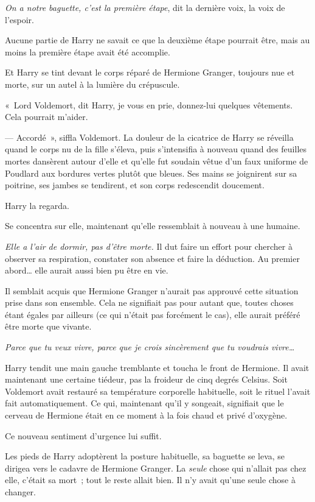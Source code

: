 \emph{On a notre baguette, c'est la première étape}, dit la dernière voix, la voix de l'espoir.

Aucune partie de Harry ne savait ce que la deuxième étape pourrait être, mais au moins la première étape avait été accomplie.

Et Harry se tint devant le corps réparé de Hermione Granger, toujours nue et morte, sur un autel à la lumière du crépuscule.

«~Lord Voldemort, dit Harry, je vous en prie, donnez-lui quelques vêtements. Cela pourrait m'aider.

--- Accordé~», siffla Voldemort. La douleur de la cicatrice de Harry se réveilla quand le corps nu de la fille s'éleva, puis s'intensifia à nouveau quand des feuilles mortes dansèrent autour d'elle et qu'elle fut soudain vêtue d'un faux uniforme de Poudlard aux bordures vertes plutôt que bleues. Ses mains se joignirent sur sa poitrine, ses jambes se tendirent, et son corps redescendit doucement.

Harry la regarda.

Se concentra sur elle, maintenant qu'elle ressemblait à nouveau à une humaine.

\emph{Elle a l'air de dormir, pas d'être morte.} Il dut faire un effort pour chercher à observer sa respiration, constater son absence et faire la déduction. Au premier abord… elle aurait aussi bien pu être en vie.

Il semblait acquis que Hermione Granger n'aurait pas approuvé cette situation prise dans son ensemble. Cela ne signifiait pas pour autant que, toutes choses étant égales par ailleurs (ce qui n'était pas forcément le cas), elle aurait préféré être morte que vivante.

\emph{Parce que tu veux vivre, parce que je crois sincèrement que tu voudrais vivre…}

Harry tendit une main gauche tremblante et toucha le front de Hermione. Il avait maintenant une certaine tiédeur, pas la froideur de cinq degrés Celsius. Soit Voldemort avait restauré sa température corporelle habituelle, soit le rituel l'avait fait automatiquement. Ce qui, maintenant qu'il y songeait, signifiait que le cerveau de Hermione était en ce moment à la fois chaud et privé d'oxygène.

Ce nouveau sentiment d'urgence lui suffit.

Les pieds de Harry adoptèrent la posture habituelle, sa baguette se leva, se dirigea vers le cadavre de Hermione Granger. La \emph{seule} chose qui n'allait pas chez elle, c'était sa mort~; tout le reste allait bien. Il n'y avait qu'une seule chose à changer.

